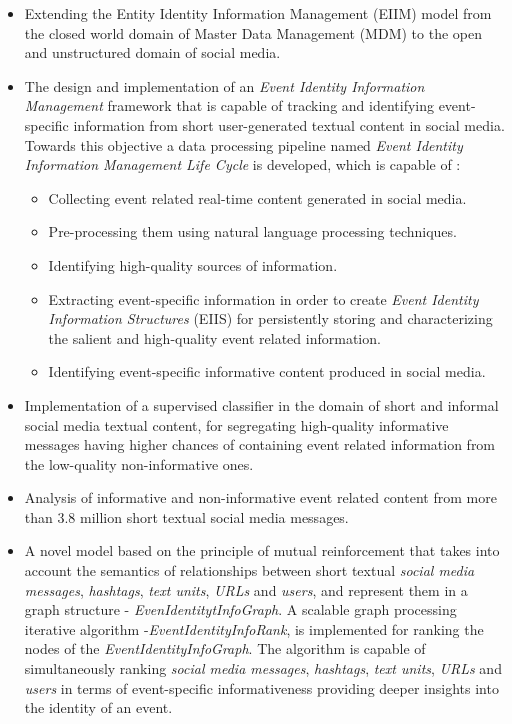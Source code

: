 \begin{itemize}
\item Extending the Entity Identity Information Management (EIIM) model  \cite{zhou2011entity} from the closed world domain of Master Data Management (MDM) to the open and unstructured domain of social media.

\item The design and implementation of an \textit{Event Identity Information Management} framework that is capable of tracking and identifying event-specific information from short user-generated textual content in social media. Towards this objective a data processing pipeline named \textit{Event Identity Information Management Life Cycle} is developed, which is capable of :
\begin{itemize}
\item Collecting event related real-time content generated in social media.
\item Pre-processing them using natural language processing techniques.
\item Identifying high-quality sources of information.
\item Extracting event-specific information in order to create \textit{Event Identity Information Structures} (EIIS) for persistently storing and characterizing the salient and high-quality event related information. 
\item Identifying event-specific informative content produced in social media.
\end{itemize}


\item Implementation of a supervised classifier in the domain of short and informal social media textual content, for segregating high-quality informative messages having higher chances of containing event related information from the low-quality non-informative ones. 

\item Analysis of informative and non-informative event related content from more than 3.8 million short textual social media messages.


\item A novel model based on the principle of mutual reinforcement that takes into account the semantics of relationships between short textual \textit{social media messages}, \textit{hashtags}, \textit{text units}, \textit{URLs} and \textit{users}, and represent them in a graph structure - \textit{EvenIdentitytInfoGraph}. A scalable graph processing iterative algorithm -\textit{EventIdentityInfoRank}, is implemented for ranking the nodes of the \textit{EventIdentityInfoGraph}. The algorithm is capable of simultaneously ranking \textit{social media messages}, \textit{hashtags}, \textit{text units}, \textit{URLs} and \textit{users} in terms of event-specific informativeness providing deeper insights into the identity of an event.


\end{itemize}

